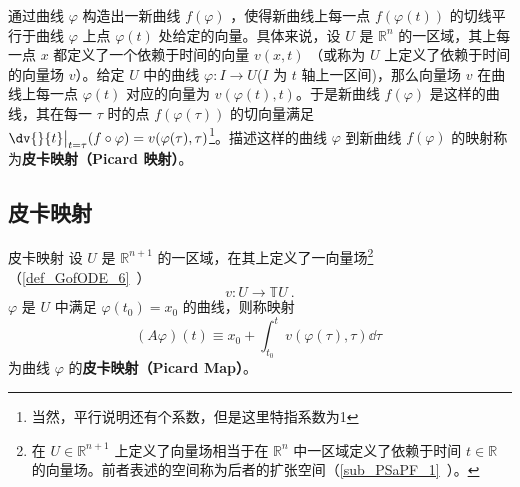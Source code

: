 
\begin{issues}
\issueDraft
\end{issues}

通过曲线 $\varphi$ 构造出一新曲线 $f(\varphi)$ ，使得新曲线上每一点 $f(\varphi(t))$ 的切线平行于曲线 $\varphi$ 上点 $\varphi(t)$ 处给定的向量。具体来说，设 $U$ 是 $\mathbb R^n$ 的一区域，其上每一点 $x$ 都定义了一个依赖于时间的向量 $v(x,t)$ （或称为 $U$ 上定义了依赖于时间的向量场 $v$）。给定 $U$ 中的曲线 $\varphi:I\rightarrow U$($I$ 为 $t$ 轴上一区间)，那么向量场 $v$ 在曲线上每一点 $\varphi(t)$ 对应的向量为 $v(\varphi(t),t)$。于是新曲线 $f(\varphi)$ 是这样的曲线，其在每一 $\tau$ 时的点 $f(\varphi(\tau))$ 的切向量满足 $\dv{}{t}\big|_{t=\tau}(f\circ \varphi)=v(\varphi(\tau),\tau)$\footnote{当然，平行说明还有个系数，但是这里特指系数为1}。描述这样的曲线 $\varphi$ 到新曲线 $f(\varphi)$ 的映射称为\textbf{皮卡映射（Picard 映射）}。
\subsection{皮卡映射}
\begin{definition}{皮卡映射}
设 $U$ 是 $\mathbb R^{n+1}$ 的一区域，在其上定义了一向量场\footnote{在 $U\in\mathbb R^{n+1}$ 上定义了向量场相当于在 $\mathbb R^n$ 中一区域定义了依赖于时间 $t\in\mathbb R$ 的向量场。前者表述的空间称为后者的扩张空间（\autoref{sub_PSaPF_1}~）。}（\autoref{def_GofODE_6}~） 
\begin{equation}
v:U\rightarrow\mathbb TU~.
\end{equation}
$\varphi$ 是 $U$ 中满足 $\varphi(t_0)=x_0$ 的曲线，则称映射
\begin{equation}
(A\varphi)(t)\equiv x_0+\int_{t_0}^{t}v(\varphi(\tau),\tau)\dd \tau~
\end{equation}
为曲线 $\varphi$ 的\textbf{皮卡映射（Picard Map）}。
\end{definition}
